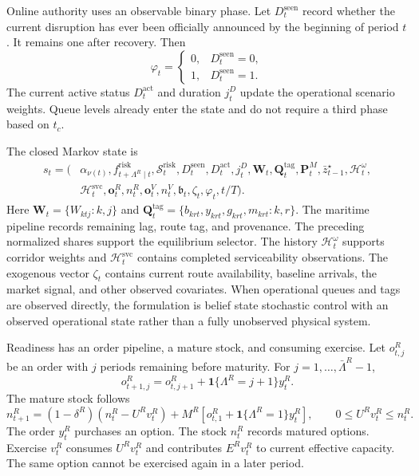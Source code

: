 \documentclass[a4paper,fleqn]{cas-sc}
\newcommand{\ind}{\mathbf{1}}           %
\begin{document}
Online authority uses an observable binary phase. Let
$D_t^{\mathrm{seen}}$ record whether the current disruption has ever been
officially announced by the beginning of period $t$. It remains one after
recovery. Then
\begin{equation}
 \varphi_t=
 \begin{cases}
 0,&D_t^{\mathrm{seen}}=0,\\
 1,&D_t^{\mathrm{seen}}=1.
 \end{cases}
 \label{eq:phase}
\end{equation}
The current active status $D_t^{\mathrm{act}}$ and duration $j_t^D$ update the
operational scenario weights. Queue levels already enter the state and do not
require a third phase based on $t_c$.

The closed Markov state is
\begin{equation}
\begin{split}
 s_t=\big(&
 \alpha_{\nu(t)},
 f^{\mathrm{risk}}_{t+\Lambda^R\mid t},
 \mathcal S_t^{\mathrm{risk}},
 D_t^{\mathrm{seen}},D_t^{\mathrm{act}},j_t^D,
 \mathbf W_t,
 \mathbf Q_t^{\mathrm{tag}},
 \mathbf P_t^M,
 \bar z^\star_{t-1},
 \mathcal H^\omega_t,\\
 &\mathcal H_t^{\mathrm{svc}},
 \mathbf o_t^R,n_t^R,
 \mathbf o_t^V,n_t^V,
 \mathfrak b_t,
 \zeta_t,\varphi_t,t/T
 \big).
 \label{eq:control-state}
\end{split}
\end{equation}
Here
$\mathbf W_t=\{W_{ktj}:k,j\}$ and
$\mathbf Q_t^{\mathrm{tag}}=
\{b_{krt},y_{krt},g_{krt},m_{krt}:k,r\}$.
The maritime pipeline records remaining lag, route tag, and provenance.
The preceding normalized shares support the equilibrium selector.
The history $\mathcal H^\omega_t$ supports corridor weights and
$\mathcal H_t^{\mathrm{svc}}$ contains completed serviceability observations.
The exogenous vector $\zeta_t$ contains current route availability, baseline
arrivals, the market signal, and other observed covariates. When operational
queues and tags are observed directly, the formulation is belief state
stochastic control with an observed operational state rather than a fully
unobserved physical system.

Readiness has an order pipeline, a mature stock, and consuming exercise. Let
$o^R_{t,j}$ be an order with $j$ periods remaining before maturity. For
$j=1,\ldots,\bar\Lambda^R-1$,
\begin{equation}
 o^R_{t+1,j}=
 o^R_{t,j+1}
 +\ind\{\Lambda^R=j+1\}y_t^R.
 \label{eq:readiness-pipeline}
\end{equation}
The mature stock follows
\begin{equation}
 n^R_{t+1}=
 (1-\delta^R)(n^R_t-U^Rv_t^R)
 +M^R\left[
 o^R_{t,1}+\ind\{\Lambda^R=1\}y_t^R
 \right],
 \qquad
 0\le U^Rv_t^R\le n^R_t.
 \label{eq:readiness-transition}
\end{equation}
The order $y^R_t$ purchases an option. The stock $n^R_t$ records matured
options. Exercise $v^R_t$ consumes $U^Rv^R_t$ and contributes
$E^Rv^R_t$ to current effective capacity. The same option cannot be exercised
again in a later period.
\end{document}
